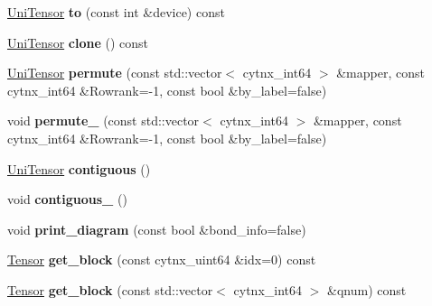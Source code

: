 \begin{DoxyCompactItemize}
\hyperlink{classcytnx_1_1UniTensor}{Uni\+Tensor} {\bfseries to} (const int \&device) const
\item 
\mbox{\label{classcytnx_1_1UniTensor_ae1125e6627eb2f5268d5c21944d31434}} 
\hyperlink{classcytnx_1_1UniTensor}{Uni\+Tensor} {\bfseries clone} () const
\item 
\mbox{\label{classcytnx_1_1UniTensor_a77ab3a44a6bfb1ab80de3d186b626d62}} 
\hyperlink{classcytnx_1_1UniTensor}{Uni\+Tensor} {\bfseries permute} (const std\+::vector$<$ cytnx\+\_\+int64 $>$ \&mapper, const cytnx\+\_\+int64 \&Rowrank=-\/1, const bool \&by\+\_\+label=false)
\item 
\mbox{\label{classcytnx_1_1UniTensor_a9fc950c25515e43fd2c6deecc1e66a99}} 
void {\bfseries permute\+\_\+} (const std\+::vector$<$ cytnx\+\_\+int64 $>$ \&mapper, const cytnx\+\_\+int64 \&Rowrank=-\/1, const bool \&by\+\_\+label=false)
\item 
\mbox{\label{classcytnx_1_1UniTensor_a450c62c231335103f723b96d0c08d18f}} 
\hyperlink{classcytnx_1_1UniTensor}{Uni\+Tensor} {\bfseries contiguous} ()
\item 
\mbox{\label{classcytnx_1_1UniTensor_a80a6e52a909c02c577ebeeb815f93ebf}} 
void {\bfseries contiguous\+\_\+} ()
\item 
\mbox{\label{classcytnx_1_1UniTensor_a685061555097873eb172381059fda92b}} 
void {\bfseries print\+\_\+diagram} (const bool \&bond\+\_\+info=false)
\item 
\mbox{\label{classcytnx_1_1UniTensor_a7d4df6dffeca0fd8eafdb9d766813f84}} 
\hyperlink{classcytnx_1_1Tensor}{Tensor} {\bfseries get\+\_\+block} (const cytnx\+\_\+uint64 \&idx=0) const
\item 
\mbox{\label{classcytnx_1_1UniTensor_a9d08b8f666a998f435ccc2ac96e6c7e5}} 
\hyperlink{classcytnx_1_1Tensor}{Tensor} {\bfseries get\+\_\+block} (const std\+::vector$<$ cytnx\+\_\+int64 $>$ \&qnum) const
\item 
\mbox{\label{classcytnx_1_1UniTensor_a661bc7073dc51b16a4b9802bbcc3cba2}} 

\end{DoxyCompactItemize}
